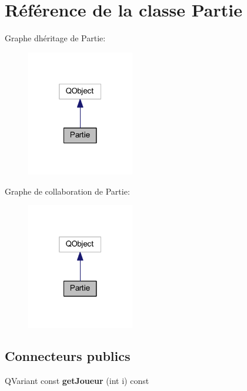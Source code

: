 \hypertarget{class_partie}{}\section{Référence de la classe Partie}
\label{class_partie}


Graphe d\textquotesingle{}héritage de Partie\+:
\nopagebreak
\begin{figure}[H]
\begin{center}
\leavevmode
\includegraphics[width=133pt]{class_partie__inherit__graph}
\end{center}
\end{figure}


Graphe de collaboration de Partie\+:
\nopagebreak
\begin{figure}[H]
\begin{center}
\leavevmode
\includegraphics[width=133pt]{class_partie__coll__graph}
\end{center}
\end{figure}
\subsection*{Connecteurs publics}
\begin{DoxyCompactItemize}
\item 
Q\+Variant const {\bfseries get\+Joueur} (int i) const \hypertarget{class_partie_a2901add3c995b28128d69ccad400982c}{}\label{class_partie_a2901add3c995b28128d69ccad400982c}

\end{DoxyCompactItemize}
